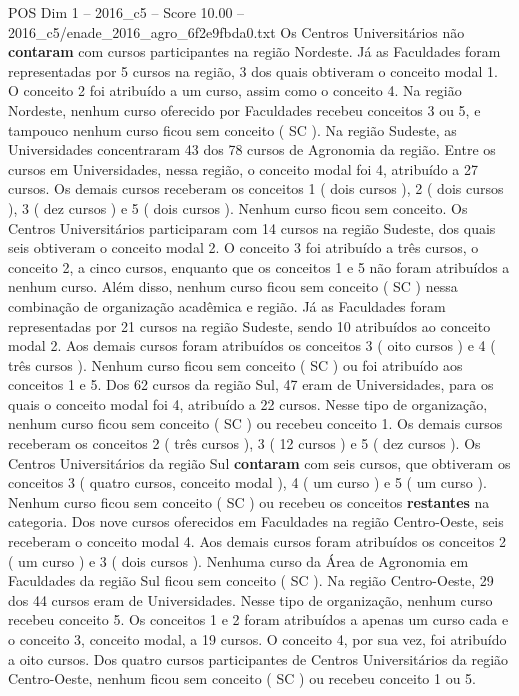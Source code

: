 \begin{textsample}{POS Dim 1 – 2016\_c5 – Score 10.00 – 2016\_c5/enade\_2016\_agro\_6f2e9fbda0.txt}
Os Centros Universitários não \textbf{contaram} com cursos participantes na região Nordeste.
Já as Faculdades foram representadas por 5 cursos na região, 3 dos quais obtiveram o conceito modal 1.
O conceito 2 foi atribuído a um curso, assim como o conceito 4.
Na região Nordeste, nenhum curso oferecido por Faculdades recebeu conceitos 3 ou 5, e tampouco nenhum curso ficou sem conceito ( SC ).
Na região Sudeste, as Universidades concentraram 43 dos 78 cursos de Agronomia da região.
Entre os cursos em Universidades, nessa região, o conceito modal foi 4, atribuído a 27 cursos.
Os demais cursos receberam os conceitos 1 ( dois cursos ), 2 ( dois cursos ), 3 ( dez cursos ) e 5 ( dois cursos ).
Nenhum curso ficou sem conceito.
Os Centros Universitários participaram com 14 cursos na região Sudeste, dos quais seis obtiveram o conceito modal 2.
O conceito 3 foi atribuído a três cursos, o conceito 2, a cinco cursos, enquanto que os conceitos 1 e 5 não foram atribuídos a nenhum curso.
Além disso, nenhum curso ficou sem conceito ( SC ) nessa combinação de organização acadêmica e região.
Já as Faculdades foram representadas por 21 cursos na região Sudeste, sendo 10 atribuídos ao conceito modal 2.
Aos demais cursos foram atribuídos os conceitos 3 ( oito cursos ) e 4 ( três cursos ).
Nenhum curso ficou sem conceito ( SC ) ou foi atribuído aos conceitos 1 e 5.
Dos 62 cursos da região Sul, 47 eram de Universidades, para os quais o conceito modal foi 4, atribuído a 22 cursos.
Nesse tipo de organização, nenhum curso ficou sem conceito ( SC ) ou recebeu conceito 1.
Os demais cursos receberam os conceitos 2 ( três cursos ), 3 ( 12 cursos ) e 5 ( dez cursos ).
Os Centros Universitários da região Sul \textbf{contaram} com seis cursos, que obtiveram os conceitos 3 ( quatro cursos, conceito modal ), 4 ( um curso ) e 5 ( um curso ).
Nenhum curso ficou sem conceito ( SC ) ou recebeu os conceitos \textbf{restantes} na categoria.
Dos nove cursos oferecidos em Faculdades na região Centro-Oeste, seis receberam o conceito modal 4.
Aos demais cursos foram atribuídos os conceitos 2 ( um curso ) e 3 ( dois cursos ).
Nenhuma curso da Área de Agronomia em Faculdades da região Sul ficou sem conceito ( SC ).
Na região Centro-Oeste, 29 dos 44 cursos eram de Universidades.
Nesse tipo de organização, nenhum curso recebeu conceito 5.
Os conceitos 1 e 2 foram atribuídos a apenas um curso cada e o conceito 3, conceito modal, a 19 cursos.
O conceito 4, por sua vez, foi atribuído a oito cursos.
Dos quatro cursos participantes de Centros Universitários da região Centro-Oeste, nenhum ficou sem conceito ( SC ) ou recebeu conceito 1 ou 5.

\end{textsample}
